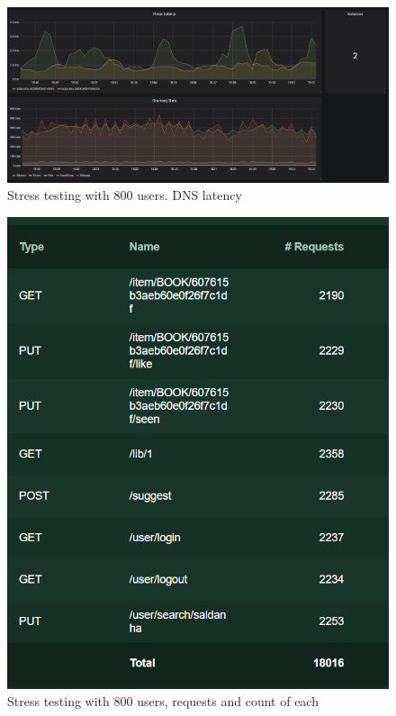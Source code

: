 \documentclass[oneside]{article}
\begin{document}
\begin{figure}[H]
  \centering
  \includegraphics[width=\textwidth]{ tests/img5.png }
  \caption{Stress testing with 800 users. DNS latency}
\end{figure}
\begin{figure}[H]
  \centering
  \includegraphics[width=\textwidth]{ tests/locust.png }
  \caption{Stress testing with 800 users, requests and count of each}
\end{figure}
\end{document}
